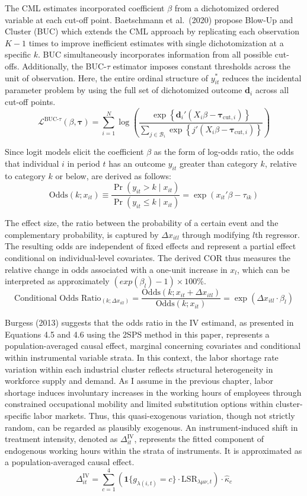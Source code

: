 \documentclass[
  12pt,
]{article}
\begin{document}
The CML estimates incorporated coefficient \(\beta\) from a dichotomized
ordered variable at each cut-off point. Baetschmann et al.~(2020)
propose Blow-Up and Cluster (BUC) which extends the CML approach by
replicating each observation \(K-1\) times to improve inefficient
estimates with single dichotomization at a specific \(k\). BUC
simultaneously incorporates information from all possible cut-offs.
Additionally, the BUC-\(\tau\) estimator imposes constant thresholds
across the unit of observation. Here, the entire ordinal structure of
\(y_{it}^*\) reduces the incidental parameter problem by using the full
set of dichotomized outcome \(\mathbf{d}_i\) across all cut-off points.
\[
\mathcal{L}^{\text{BUC-}\tau}(\beta, \boldsymbol{\tau}) = \sum_{i=1}^{N} \log \left(
\frac{ \exp\left\{ \mathbf{d}_i' \left( X_i \beta - \boldsymbol{\tau}_{\text{cut},i} \right) \right\} }{
\sum_{j \in \mathcal{B}_i} \exp\left\{ j' \left( X_i \beta - \boldsymbol{\tau}_{\text{cut},i} \right) \right\} }
\right)
\]

Since logit models elicit the coefficient \(\beta\) as the form of
log-odds ratio, the odds that individual \(i\) in period \(t\) has an
outcome \(y_{it}\) greater than category \(k\), relative to category
\(k\) or below, are derived as follows: \[
\text{Odds}(k; x_{it}) \equiv \frac{\Pr(y_{it} > k \mid x_{it})}{\Pr(y_{it} \leq k \mid x_{it})} = \exp(x_{it}'\beta - \tau_{ik})
\]

The effect size, the ratio between the probability of a certain event
and the complementary probability, is captured by \(\Delta x_{itl}\)
through modifying \(l\)th regressor. The resulting odds are independent
of fixed effects and represent a partial effect conditional on
individual-level covariates. The derived COR thus measures the relative
change in odds associated with a one-unit increase in \(x_l\), which can
be interpreted as approximately \((exp(\beta_l)-1) \times 100\)\%. \[
\text{Conditional Odds Ratio}_{(k; \Delta x_{itl})} 
= \frac{\text{Odds}(k; x_{it} + \Delta x_{itl})}{\text{Odds}(k; x_{it})}
= \exp(\Delta x_{itl} \cdot \beta_l)
\]

Burgess (2013) suggests that the odds ratio in the IV estimand, as
presented in Equations 4.5 and 4.6 using the 2SPS method in this paper,
represents a population-averaged causal effect, marginal concerning
covariates and conditional within instrumental variable strata. In this
context, the labor shortage rate variation within each industrial
cluster reflects structural heterogeneity in workforce supply and
demand. As I assume in the previous chapter, labor shortage induces
involuntary increases in the working hours of employees through
constrained occupational mobility and limited substitution options
within cluster-specific labor markets. Thus, this quasi-exogenous
variation, though not strictly random, can be regarded as plausibly
exogenous. An instrument-induced shift in treatment intensity, denoted
as \(\Delta_{it}^{\text{IV}}\), represents the fitted component of
endogenous working hours within the strata of instruments. It is
approximated as a population-averaged causal effect. \[
\Delta_{it}^{\text{IV}} = \sum_{c=1}^{4} \left(\mathbf{1}\{g_{\lambda(i,t)} = c\} \cdot \text{LSR}_{\lambda\mu\nu,t} \right) \cdot \hat{\kappa}_c
\]
\end{document}
